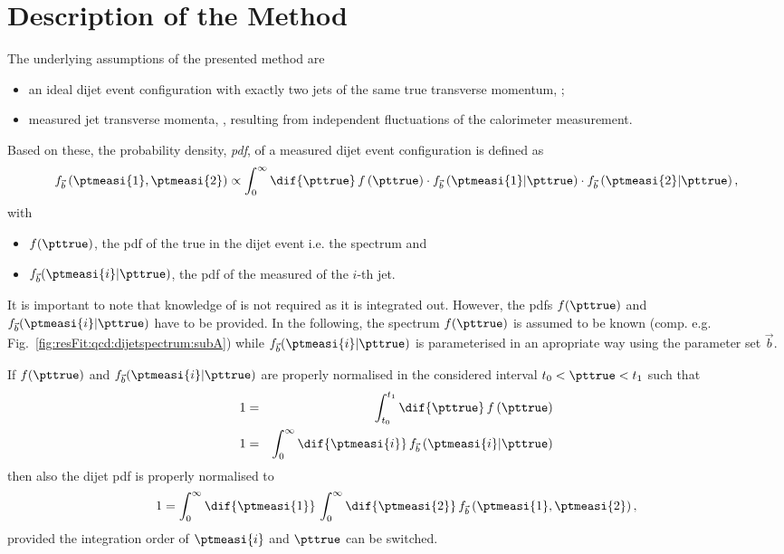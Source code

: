 

\section{Description of the Method}

The underlying assumptions of the presented method are
\begin{itemize}
\item an ideal dijet event configuration with exactly two jets of the
  same true transverse momentum, \pttrue;
\item measured jet transverse momenta, , resulting from
  independent fluctuations of the calorimeter measurement.
\end{itemize}
Based on these, the probability density, \textit{pdf}, of a measured dijet event configuration is defined as
\begin{equation}
  \label{eq:resFit:dijetPdf}
  f_{\vec{b}}\left(\ptmeasi{1},\ptmeasi{2}\right) \propto \int^{\infty}_{0}\dif{\pttrue}\,f\left(\pttrue\right)
  \cdot f_{\vec{b}}\left(\ptmeasi{1}|\pttrue\right)
  \cdot f_{\vec{b}}\left(\ptmeasi{2}|\pttrue\right),
\end{equation}
with
\begin{itemize}
\item $f(\pttrue)$, the pdf of the true \pt in the dijet event i.e. the
  spectrum and
\item $f_{\vec{b}}(\ptmeasi{i}|\pttrue)$, the pdf of the measured \pt
  of the $i$-th jet.
\end{itemize}
It is important to note that knowledge of \pttrue is not required as it is integrated out.
However, the pdfs $f(\pttrue)$ and $f_{\vec{b}}(\ptmeasi{i}|\pttrue)$ have to be provided.
In the following, the spectrum $f(\pttrue)$ is assumed to be known (comp. e.g. Fig.~\ref{fig:resFit:qcd:dijetspectrum:subA}) while $f_{\vec{b}}(\ptmeasi{i}|\pttrue)$ is parameterised in an apropriate way using the parameter set $\vec{b}$.

If $f(\pttrue)$ and $f_{\vec{b}}(\ptmeasi{i}|\pttrue)$ are properly normalised in the considered interval \mbox{$t_{0} < \pttrue < t_{1}$} such that
\begin{eqnarray*}
  1 & = & \int^{t_{1}}_{t_{0}}\dif{\pttrue}\,f\left(\pttrue\right) \\
  1 & = & \int^{\infty}_{0}\dif{\ptmeasi{i}}\,f_{\vec{b}}\left(\ptmeasi{i}|\pttrue\right)
\end{eqnarray*}
then also the dijet pdf is properly normalised to
\begin{equation*}
  1 = \int^{\infty}_{0}\dif{\ptmeasi{1}}\,\int^{\infty}_{0}\dif{\ptmeasi{2}}\, f_{\vec{b}}\left(\ptmeasi{1},\ptmeasi{2}\right),
\end{equation*}
provided the integration order of $\ptmeasi{i}$ and $\pttrue$ can be switched.

